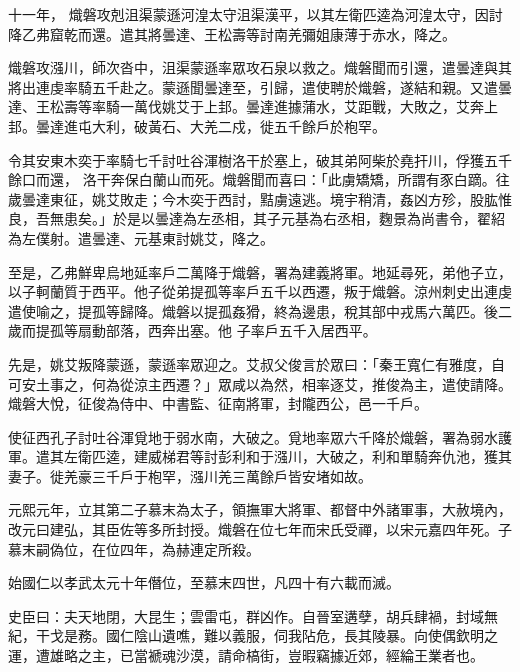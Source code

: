 \begin{pinyinscope}
 十一年，
 熾磐攻剋沮渠蒙遜河湟太守沮渠漢平，以其左衛匹逵為河湟太守，因討降乙弗窟乾而還。遣其將曇達、王松壽等討南羌彌姐康薄于赤水，降之。



 熾磐攻漒川，師次沓中，沮渠蒙遜率眾攻石泉以救之。熾磐聞而引還，遣曇達與其將出連虔率騎五千赴之。蒙遜聞曇達至，引歸，遣使聘於熾磐，遂結和親。又遣曇達、王松壽等率騎一萬伐姚艾于上邽。曇達進據蒲水，艾距戰，大敗之，艾奔上邽。曇達進屯大利，破黃石、大羌二戍，徙五千餘戶於枹罕。



 令其安東木奕于率騎七千討吐谷渾樹洛干於塞上，破其弟阿柴於堯扞川，俘獲五千餘口而還，
 洛干奔保白蘭山而死。熾磐聞而喜曰：「此虜矯矯，所謂有豕白蹢。往歲曇達東征，姚艾敗走；今木奕于西討，黠虜遠逃。境宇稍清，姦凶方殄，股肱惟良，吾無患矣。」於是以曇達為左丞相，其子元基為右丞相，麴景為尚書令，翟紹為左僕射。遣曇達、元基東討姚艾，降之。



 至是，乙弗鮮卑烏地延率戶二萬降于熾磐，署為建義將軍。地延尋死，弟他子立，以子軻蘭質于西平。他子從弟提孤等率戶五千以西遷，叛于熾磐。涼州刺史出連虔遣使喻之，提孤等歸降。熾磐以提孤姦猾，終為邊患，稅其部中戎馬六萬匹。後二歲而提孤等扇動部落，西奔出塞。他
 子率戶五千入居西平。



 先是，姚艾叛降蒙遜，蒙遜率眾迎之。艾叔父俊言於眾曰：「秦王寬仁有雅度，自可安土事之，何為從涼主西遷？」眾咸以為然，相率逐艾，推俊為主，遣使請降。熾磐大悅，征俊為侍中、中書監、征南將軍，封隴西公，邑一千戶。



 使征西孔子討吐谷渾覓地于弱水南，大破之。覓地率眾六千降於熾磐，署為弱水護軍。遣其左衛匹逵，建威梯君等討彭利和于漒川，大破之，利和單騎奔仇池，獲其妻子。徙羌豪三千戶于枹罕，漒川羌三萬餘戶皆安堵如故。



 元熙元年，立其第二子慕末為太子，領撫軍大將軍、都督中外諸軍事，大赦境內，
 改元曰建弘，其臣佐等多所封授。熾磐在位七年而宋氏受禪，以宋元嘉四年死。子慕末嗣偽位，在位四年，為赫連定所殺。



 始國仁以孝武太元十年僭位，至慕末四世，凡四十有六載而滅。



 史臣曰：夫天地閉，大昆生；雲雷屯，群凶作。自晉室遘孽，胡兵肆禍，封域無紀，干戈是務。國仁陰山遺噍，難以義服，伺我阽危，長其陵暴。向使偶欽明之運，遭雄略之主，已當褫魂沙漠，請命槁街，豈暇竊據近郊，經綸王業者也。




\end{pinyinscope}
